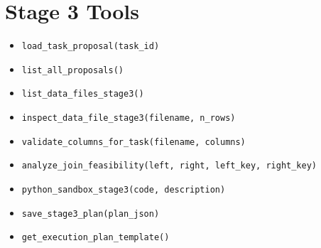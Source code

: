 \documentclass[12pt,a4paper]{report}
\begin{document}
\section{Stage 3 Tools}
\begin{itemize}
    \item \texttt{load\_task\_proposal(task\_id)}
    \item \texttt{list\_all\_proposals()}
    \item \texttt{list\_data\_files\_stage3()}
    \item \texttt{inspect\_data\_file\_stage3(filename, n\_rows)}
    \item \texttt{validate\_columns\_for\_task(filename, columns)}
    \item \texttt{analyze\_join\_feasibility(left, right, left\_key, right\_key)}
    \item \texttt{python\_sandbox\_stage3(code, description)}
    \item \texttt{save\_stage3\_plan(plan\_json)}
    \item \texttt{get\_execution\_plan\_template()}
\end{itemize}
\end{document}
